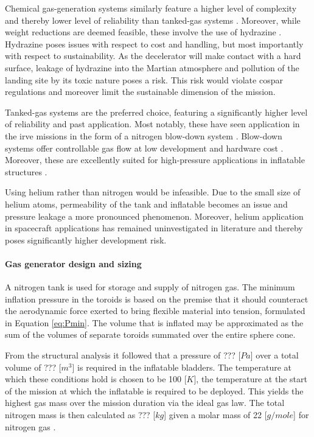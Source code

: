Chemical gas-generation systems similarly feature a higher level of complexity and thereby lower level of reliability than tanked-gas systems \cite{Jenkins2001}. Moreover, while weight reductions are deemed feasible, these involve the use of hydrazine \cite{Jenkins2001, Freeland1998}. Hydrazine poses issues with respect to cost and handling, but most importantly with respect to sustainability. As the decelerator will make contact with a hard surface, leakage of hydrazine into the Martian atmosphere and pollution of the landing site by its toxic nature poses a risk. This risk would violate \gls{cospar} regulations and moreover limit the sustainable dimension of the mission.

Tanked-gas systems are the preferred choice, featuring a significantly higher level of reliability and past application. Most notably, these have seen application in the \gls{irve} missions in the form of a nitrogen blow-down system \cite{Smith2010}. Blow-down systems offer controllable gas flow at low development and hardware cost \cite{Freeland1998}. Moreover, these are excellently suited for high-pressure applications in inflatable structures \cite{Jenkins2001}.

Using helium rather than nitrogen would be infeasible. Due to the small size of helium atoms, permeability of the tank and inflatable becomes an issue and pressure leakage a more pronounced phenomenon. Moreover, helium application in spacecraft applications has remained uninvestigated in literature and thereby poses significantly higher development risk.


\paragraph{Gas generator design and sizing}
A nitrogen tank is used for storage and supply of nitrogen gas. The minimum inflation pressure in the toroids is based on the premise that it should counteract the aerodynamic force exerted to bring flexible material into tension, formulated in Equation \ref{eq:Pmin}. The volume that is inflated may be approximated as the sum of the volumes of separate toroids summated over the entire sphere cone.

From the structural analysis it followed that a pressure of  ??? [$Pa$] over a total volume of ??? [$m^{3}$] is required in the inflatable bladders. The temperature at which these conditions hold is chosen to be 100 [$K$], the temperature at the start of the mission at which the inflatable is required to be deployed. This yields the highest gas mass over the mission duration via the ideal gas law. The total nitrogen mass is then calculated as ??? [$kg$] given a molar mass of 22 [$g/mole$] for nitrogen gas \cite{Samareh2011}.

